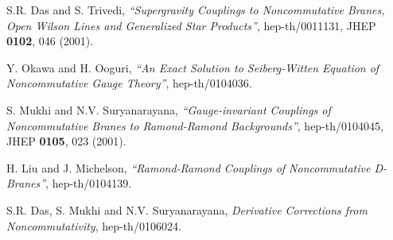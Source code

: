 \documentclass[a4paper,a4paper]{amsproc}
\theoremstyle{definition}
\theoremstyle{remark}
\numberwithin{equation}{section}
\begin{document}
\begin{thebibliography}{A}
 S.R. Das and S. Trivedi, \textit{ ``Supergravity
Couplings to Noncommutative Branes, Open Wilson Lines and Generalized
Star Products''}, hep-th/0011131, JHEP {\bf 0102}, 046 (2001).

 Y. Okawa and H. Ooguri, \textit{``An Exact Solution to 
Seiberg-Witten Equation of Noncommutative Gauge Theory''},
hep-th/0104036.

 S. Mukhi and N.V. Suryanarayana,
\textit{``Gauge-invariant Couplings of Noncommutative Branes to
Ramond-Ramond Backgrounds''}, hep-th/0104045, JHEP {\bf 0105}, 023
(2001).

 H. Liu and J. Michelson, \textit{``Ramond-Ramond 
Couplings of Noncommutative D-Branes''}, hep-th/0104139.

 S.R. Das, S. Mukhi and N.V. Suryanarayana,
\textit{Derivative Corrections from Noncommutativity}, hep-th/0106024.

\end{thebibliography}
\end{document}
